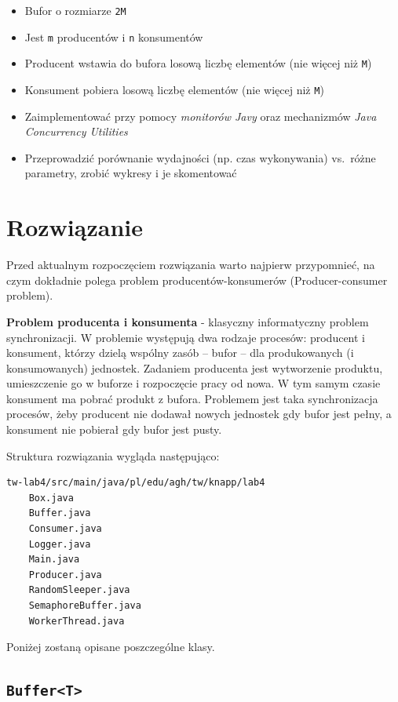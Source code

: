 \documentclass[11pt]{article}
\providecommand{\tightlist}{%
      \setlength{\itemsep}{0pt}\setlength{\parskip}{0pt}}
\begin{document}
\begin{itemize}
\tightlist
\item
  Bufor o rozmiarze \texttt{2M}
\item
  Jest \texttt{m} producentów i \texttt{n} konsumentów
\item
  Producent wstawia do bufora losową liczbę elementów (nie więcej niż
  \texttt{M})
\item
  Konsument pobiera losową liczbę elementów (nie więcej niż \texttt{M})
\item
  Zaimplementować przy pomocy \emph{monitorów Javy} oraz mechanizmów
  \emph{Java Concurrency Utilities}
\item
  Przeprowadzić porównanie wydajności (np. czas wykonywania) vs.~różne
  parametry, zrobić wykresy i je skomentować
\end{itemize}

    \hypertarget{rozwiux105zanie}{%
\section{Rozwiązanie}\label{rozwiux105zanie}}

Przed aktualnym rozpoczęciem rozwiązania warto najpierw przypomnieć, na
czym dokładnie polega problem producentów-konsumerów (Producer-consumer
problem).

\textbf{Problem producenta i konsumenta} - klasyczny informatyczny
problem synchronizacji. W problemie występują dwa rodzaje procesów:
producent i konsument, którzy dzielą wspólny zasób -- bufor -- dla
produkowanych (i konsumowanych) jednostek. Zadaniem producenta jest
wytworzenie produktu, umieszczenie go w buforze i rozpoczęcie pracy od
nowa. W tym samym czasie konsument ma pobrać produkt z bufora. Problemem
jest taka synchronizacja procesów, żeby producent nie dodawał nowych
jednostek gdy bufor jest pełny, a konsument nie pobierał gdy bufor jest
pusty.

Struktura rozwiązania wygląda następująco:

\begin{verbatim}
tw-lab4/src/main/java/pl/edu/agh/tw/knapp/lab4
    Box.java
    Buffer.java
    Consumer.java
    Logger.java
    Main.java
    Producer.java
    RandomSleeper.java
    SemaphoreBuffer.java
    WorkerThread.java
\end{verbatim}

Poniżej zostaną opisane poszczególne klasy.

    \hypertarget{buffert}{%
\subsection{\texorpdfstring{\texttt{Buffer\textless{}T\textgreater{}}}{Buffer\textless T\textgreater{}}}\label{buffert}}
\end{document}
